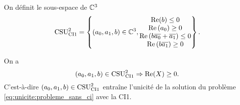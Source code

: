 
    \begin{defn}
      \label{def:csu:ci1-2}

      On définit le sous-espace de \(\CC^3\)
      \begin{equation*}
        \CSU[2]{CI1} = \left\lbrace
        (a_0,a_1,b) \in \CC^3,
        \begin{matrix}
        \Re(b) \le 0
        \\
        \Re\left(a_0\right) \ge 0
        \\
        \Re\left(b\conj{a_0}+\conj{a_1}\right) \le 0
        \\
        \Re\left(b\conj{a_1}\right) \ge 0
        \end{matrix}
        \right\rbrace.
      \end{equation*}
    \end{defn}

    \begin{prop}
      \label{prop:csu:ci1-2}
      On a 
      \begin{equation*}
        (a_0,a_1,b) \in \CSU[2]{CI1} \Rightarrow \Re(X)\ge 0. 
      \end{equation*}
      C'est-à-dire \((a_0,a_1,b) \in \CSU[2]{CI1}\) entraîne l'unicité de la solution du problème \eqref{eq:unicite:probleme_sans_ci} avec la CI1.
    \end{prop}


